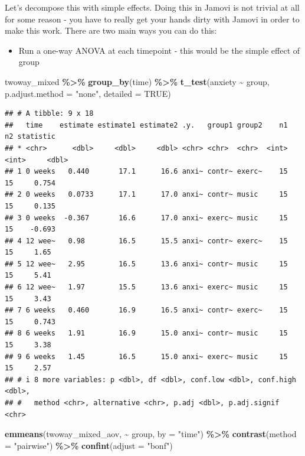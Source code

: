 \documentclass[
]{book}
\newenvironment{Shaded}{\begin{snugshade}}{\end{snugshade}}
\newcommand{\AttributeTok}[1]{\textcolor[rgb]{0.13,0.29,0.53}{#1}}
\newcommand{\ConstantTok}[1]{\textcolor[rgb]{0.56,0.35,0.01}{#1}}
\newcommand{\FunctionTok}[1]{\textcolor[rgb]{0.13,0.29,0.53}{\textbf{#1}}}
\newcommand{\NormalTok}[1]{#1}
\newcommand{\SpecialCharTok}[1]{\textcolor[rgb]{0.81,0.36,0.00}{\textbf{#1}}}
\newcommand{\StringTok}[1]{\textcolor[rgb]{0.31,0.60,0.02}{#1}}
\providecommand{\tightlist}{%
  \setlength{\itemsep}{0pt}\setlength{\parskip}{0pt}}
\begin{document}
Let's decompose this with simple effects. Doing this in Jamovi is not trivial at all for some reason - you have to really get your hands dirty with Jamovi in order to make this work. There are two main ways you can do this:

\begin{itemize}
\tightlist
\item
  Run a one-way ANOVA at each timepoint - this would be the simple effect of group
\end{itemize}

\begin{Shaded}
\begin{Highlighting}[]
\NormalTok{twoway\_mixed }\SpecialCharTok{\%\textgreater{}\%}
  \FunctionTok{group\_by}\NormalTok{(time) }\SpecialCharTok{\%\textgreater{}\%}
  \FunctionTok{t\_test}\NormalTok{(anxiety }\SpecialCharTok{\textasciitilde{}}\NormalTok{ group, }\AttributeTok{p.adjust.method =} \StringTok{"none"}\NormalTok{, }\AttributeTok{detailed =} \ConstantTok{TRUE}\NormalTok{)}
\end{Highlighting}
\end{Shaded}

\begin{verbatim}
## # A tibble: 9 x 18
##   time    estimate estimate1 estimate2 .y.   group1 group2    n1    n2 statistic
## * <chr>      <dbl>     <dbl>     <dbl> <chr> <chr>  <chr>  <int> <int>     <dbl>
## 1 0 weeks   0.440       17.1      16.6 anxi~ contr~ exerc~    15    15     0.754
## 2 0 weeks   0.0733      17.1      17.0 anxi~ contr~ music     15    15     0.135
## 3 0 weeks  -0.367       16.6      17.0 anxi~ exerc~ music     15    15    -0.693
## 4 12 wee~   0.98        16.5      15.5 anxi~ contr~ exerc~    15    15     1.65 
## 5 12 wee~   2.95        16.5      13.6 anxi~ contr~ music     15    15     5.41 
## 6 12 wee~   1.97        15.5      13.6 anxi~ exerc~ music     15    15     3.43 
## 7 6 weeks   0.460       16.9      16.5 anxi~ contr~ exerc~    15    15     0.743
## 8 6 weeks   1.91        16.9      15.0 anxi~ contr~ music     15    15     3.38 
## 9 6 weeks   1.45        16.5      15.0 anxi~ exerc~ music     15    15     2.57 
## # i 8 more variables: p <dbl>, df <dbl>, conf.low <dbl>, conf.high <dbl>,
## #   method <chr>, alternative <chr>, p.adj <dbl>, p.adj.signif <chr>
\end{verbatim}

\begin{Shaded}
\begin{Highlighting}[]
\FunctionTok{emmeans}\NormalTok{(twoway\_mixed\_aov, }\SpecialCharTok{\textasciitilde{}}\NormalTok{ group, }\AttributeTok{by =} \StringTok{"time"}\NormalTok{) }\SpecialCharTok{\%\textgreater{}\%}
  \FunctionTok{contrast}\NormalTok{(}\AttributeTok{method =} \StringTok{"pairwise"}\NormalTok{) }\SpecialCharTok{\%\textgreater{}\%}
  \FunctionTok{confint}\NormalTok{(}\AttributeTok{adjust =} \StringTok{"bonf"}\NormalTok{)}
\end{Highlighting}
\end{Shaded}
\end{document}
